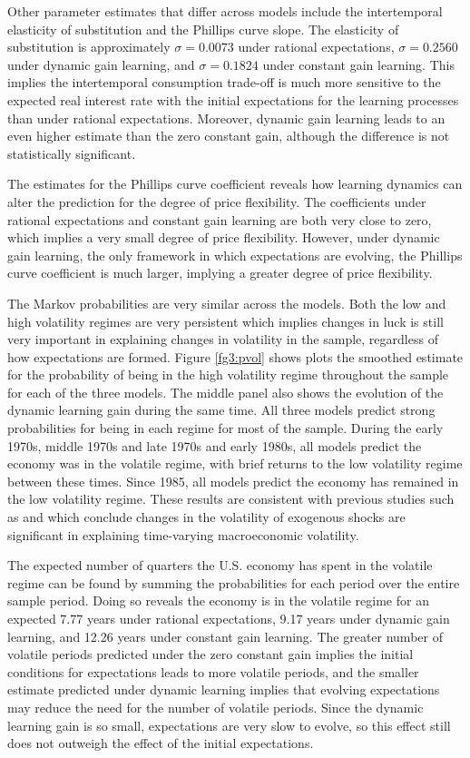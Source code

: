 Other parameter estimates that differ across models include the intertemporal elasticity of substitution and the Phillips curve slope.  The elasticity of substitution is approximately $\sigma=0.0073$ under rational expectations, $\sigma=0.2560$ under dynamic gain learning, and $\sigma=0.1824$ under constant gain learning.  This implies the intertemporal consumption trade-off is much more sensitive to the expected real interest rate with the initial expectations for the learning processes than under rational expectations.  Moreover, dynamic gain learning leads to an even higher estimate than the zero constant gain, although the difference is not statistically significant.

The estimates for the Phillips curve coefficient reveals how learning dynamics can alter the prediction for the degree of price flexibility.  The coefficients under rational expectations and constant gain learning are both very close to zero, which implies a very small degree of price flexibility.  However, under dynamic gain learning, the only framework in which expectations are evolving, the Phillips curve coefficient is much larger, implying a greater degree of price flexibility.  

The Markov probabilities are very similar across the models.  Both the low and high volatility regimes are very persistent which implies changes in luck is still very important in explaining changes in volatility in the sample, regardless of how expectations are formed.  Figure \ref{fg3:pvol} shows plots the smoothed estimate for the probability of being in the high volatility regime throughout the sample for each of the three models.  The middle panel also shows the evolution of the dynamic learning gain during the same time.  All three models predict strong probabilities for being in each regime for most of the sample.  During the early 1970s, middle 1970s and late 1970s and early 1980s, all models predict the economy was in the volatile regime, with brief returns to the low volatility regime between these times.  Since 1985, all models predict the economy has remained in the low volatility regime.  These results are consistent with previous studies such as  and  which conclude changes in the volatility of exogenous shocks are significant in explaining time-varying macroeconomic volatility.  

The expected number of quarters the U.S. economy has spent in the volatile regime can be found by summing the probabilities for each period over the entire sample period.  Doing so reveals the economy is in the volatile regime for an expected 7.77 years under rational expectations, 9.17 years under dynamic gain learning, and 12.26 years under constant gain learning.  The greater number of volatile periods predicted under the zero constant gain implies the initial conditions for expectations leads to more volatile periods, and the smaller estimate predicted under dynamic learning implies that evolving expectations may reduce the need for the number of volatile periods.  Since the dynamic learning gain is so small, expectations are very slow to evolve, so this effect still does not outweigh the effect of the initial expectations. 

